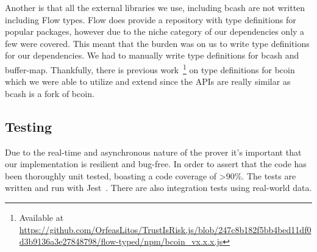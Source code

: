 Another is that all the external libraries we use, including bcash are not written including Flow types. Flow does provide a repository with type definitions for popular packages, however due to the niche category of our dependencies only a few were covered. This meant that the burden was on us to write type definitions for our dependencies. We had to manually write type definitions for bcash and buffer-map. Thankfully, there is previous work~\footnote{Available at \url{https://github.com/OrfeasLitos/TrustIsRisk.js/blob/247c8b182f5bb4bed11df0d3b9136a3e27848798/flow-typed/npm/bcoin_vx.x.x.js}} on type definitions for bcoin which we were able to utilize and extend since the APIs are really similar as bcash is a fork of bcoin.

\subsection{Testing}
Due to the real-time and asynchronous nature of the prover it's important that our implementation is resilient and bug-free. In order to assert that the code has been thoroughly unit tested, boasting a code coverage of >90\%. The tests are written and run with Jest~\cite{jest}. There are also integration tests using real-world data.
